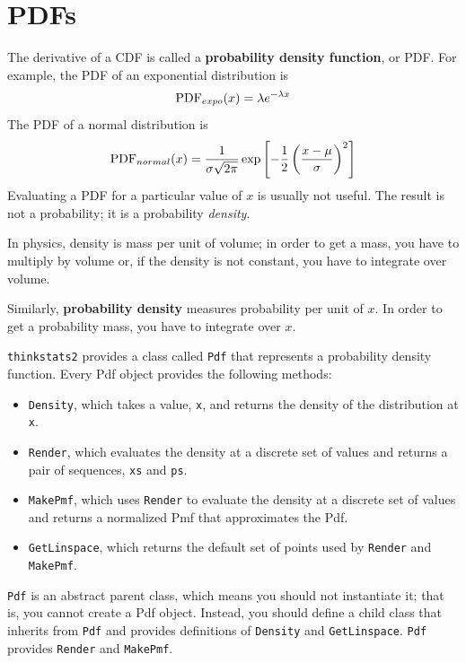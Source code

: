 \documentclass[12pt]{book}
\begin{document}
\section{PDFs}

The derivative of a CDF is called a {\bf probability density function},
or PDF.  For example, the PDF of an exponential distribution is
%
\[ \mathrm{PDF}_{expo}(x) = \lambda e^{-\lambda x}   \]
%
The PDF of a normal distribution is
%
\[ \mathrm{PDF}_{normal}(x) = \frac{1}{\sigma \sqrt{2 \pi}} 
                 \exp \left[ -\frac{1}{2} 
                 \left( \frac{x - \mu}{\sigma} \right)^2 \right]  \]
%
Evaluating a PDF for a particular value of $x$ is usually not useful.
The result is not a probability; it is a probability {\em density}.

In physics, density is mass per unit of
volume; in order to get a mass, you have to multiply by volume or,
if the density is not constant, you have to integrate over volume.

Similarly, {\bf probability density} measures probability per unit of $x$.
In order to get a probability mass, you have to integrate over $x$.

{\tt thinkstats2} provides a class called {\tt Pdf} that represents
a probability density function.  Every Pdf object provides the
following methods:

\begin{itemize}

\item {\tt Density}, which takes a value, {\tt x}, and returns the
  density of the distribution at {\tt x}.

\item {\tt Render}, which evaluates the density at a discrete set of
  values and returns a pair of sequences, {\tt xs} and {\tt ps}.

\item {\tt MakePmf}, which uses {\tt Render} to evaluate the density
  at a discrete set of values and returns a normalized Pmf that
  approximates the Pdf.

\item {\tt GetLinspace}, which returns the default set of points used 
  by {\tt Render} and {\tt MakePmf}.

\end{itemize}  

{\tt Pdf} is an abstract parent class, which means you should not
instantiate it; that is, you cannot create a Pdf object.  Instead, you
should define a child class that inherits from {\tt Pdf} and provides
definitions of {\tt Density} and {\tt GetLinspace}.  {\tt Pdf} provides
{\tt Render} and {\tt MakePmf}.
\end{document}
